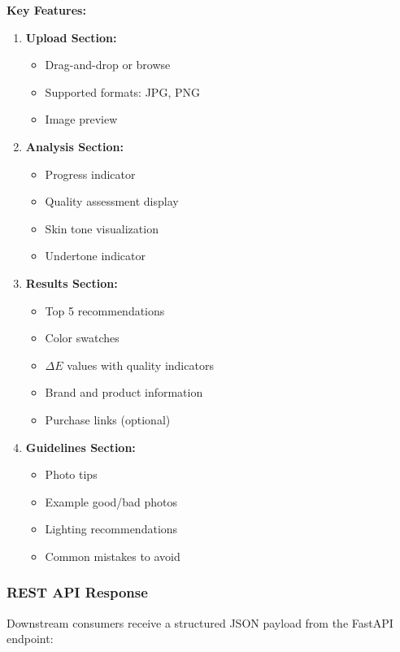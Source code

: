 \textbf{Key Features:}
\begin{enumerate}
    \item \textbf{Upload Section:}
    \begin{itemize}
        \item Drag-and-drop or browse
        \item Supported formats: JPG, PNG
        \item Image preview
    \end{itemize}
    
    \item \textbf{Analysis Section:}
    \begin{itemize}
        \item Progress indicator
        \item Quality assessment display
        \item Skin tone visualization
        \item Undertone indicator
    \end{itemize}
    
    \item \textbf{Results Section:}
    \begin{itemize}
        \item Top 5 recommendations
        \item Color swatches
        \item $\Delta E$ values with quality indicators
        \item Brand and product information
        \item Purchase links (optional)
    \end{itemize}
    
    \item \textbf{Guidelines Section:}
    \begin{itemize}
        \item Photo tips
        \item Example good/bad photos
        \item Lighting recommendations
        \item Common mistakes to avoid
    \end{itemize}
\end{enumerate}

\subsubsection{REST API Response}

Downstream consumers receive a structured JSON payload from the FastAPI endpoint:

